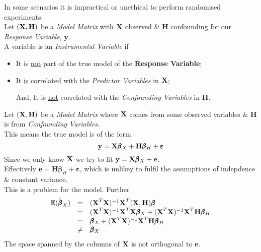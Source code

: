 \documentclass[11pt,a4paper]{article}
\begin{document}
In some scenarios it is impractical or unethical to perform randomised experiments.\\

Let $(\textbf{X},\textbf{H})$ be a \textit{Model Matrix} with $\textbf{X}$ observed \& $\textbf{H}$ confounding for our \textit{Response Variable}, $\textbf{y}$.\\
A variable is an \textit{Instrumental Variable} if
\begin{itemize}
	\item It is \underline{not} part of the true model of the \textbf{Response Variable};
	\item It \underline{is} correlated with the \textit{Predictor Variables} in $\textbf{X}$;
	\item[And,] It is \underline{not} correlated with the \textit{Confounding Variables} in $\textbf{H}$.
\end{itemize}


Let $(\textbf{X},\textbf{H})$ be a \textit{Model Matrix} where $\textbf{X}$ comes from some observed variables \& $\textbf{H}$ is from \textit{Confounding Variables}.\\
This means the true model is of the form
$$\textbf{y}=\textbf{X}\pmb\beta_X+\textbf{H}\pmb\beta_H+\pmb\varepsilon$$
Since we only know $\textbf{X}$ we try to fit $\textbf{y}=\textbf{X}\pmb\beta_X+\textbf{e}$.\\
Effectively $\textbf{e}=\textbf{H}\pmb\beta_H+\pmb\varepsilon$, which is unlikey to fulfil the assumptions of indepdence \& constant variance.\\
This is a problem for the model. Further
\[\begin{array}{rcl}
\mathbb{E}(\hat{\pmb\beta}_X)&=&(\textbf{X}^T\textbf{X})^{-1}\textbf{X}^T(\textbf{X},\textbf{H})\pmb\beta\\
&=&(\textbf{X}^T\textbf{X})^{-1}\textbf{X}^T\textbf{X}\pmb\beta_X+(\textbf{X}^T\textbf{X})^{-1}\textbf{X}^T\textbf{H}\pmb\beta_H\\
&=&\pmb\beta_X+(\textbf{X}^T\textbf{X})^{-1}\textbf{X}^T\textbf{H}\pmb\beta_H\\
&\neq&\pmb\beta_X
\end{array}\]
\nb The space spanned by the columns of $\textbf{X}$ is not orthogonal to $\textbf{e}$.\\
\end{document}

